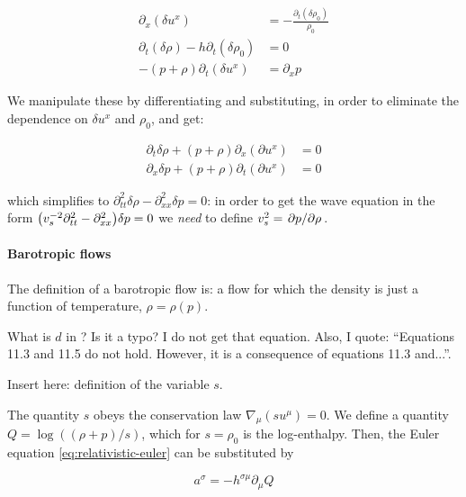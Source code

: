 \documentclass[main.tex]{subfiles}
\begin{document}
\begin{subequations}
\begin{align}
  \partial_x (\delta u^x) &= -\frac{\partial_t (\delta \rho_0)}{\rho_0}  \\
  \partial_t (\delta \rho) - h \partial_t (\delta \rho_0) &= 0  \\
  -(p+ \rho) \partial_t (\delta u^x) &= \partial_x p
\end{align}
\end{subequations}

We manipulate these by differentiating and substituting, in order to eliminate the dependence on \(\delta u^x\) and \(\rho_0\), and get:

\begin{subequations}
\begin{align}
  \partial_t \delta \rho + (p+\rho) \partial_x (\partial u^x) &= 0 \\
  \partial_x \delta p + (p+\rho) \partial_t (\partial u^x) &= 0
\end{align}
\end{subequations}

which simplifies to \(\partial_{tt}^2 \delta \rho - \partial_{xx}^2 \delta p = 0\): in order to get the wave equation in the form \(\qty(v_s^{-2} \partial_{tt}^2 - \partial_{xx}^2 ) \delta p = 0\) we \emph{need} to define \(v_s^2 = \pdv*{p}{\rho}\).

\paragraph{Barotropic flows}

The definition of a barotropic flow is: a flow for which the density is just a function of temperature, \(\rho = \rho (p)\).

\begin{greenbox}
  What is \(d\) in \cite[equation 11.10]{Taub:1978}? Is it a typo? I do not get that equation. Also, I quote: ``Equations 11.3 and 11.5 do not hold. However, it is a consequence of equations 11.3 and...''.

  Insert here: definition of the variable \(s\).
\end{greenbox}

The quantity \(s\) obeys the conservation law \(\nabla_\mu (s u^\mu) = 0\). We define a quantity \(Q = \log ((\rho + p)/s )\), which for \(s=\rho_0\) is the log-enthalpy. Then, the Euler equation \eqref{eq:relativistic-euler} can be substituted by

\begin{equation}
  a^\sigma = - h^{\sigma \mu} \partial_\mu Q
\end{equation}
\end{document}
